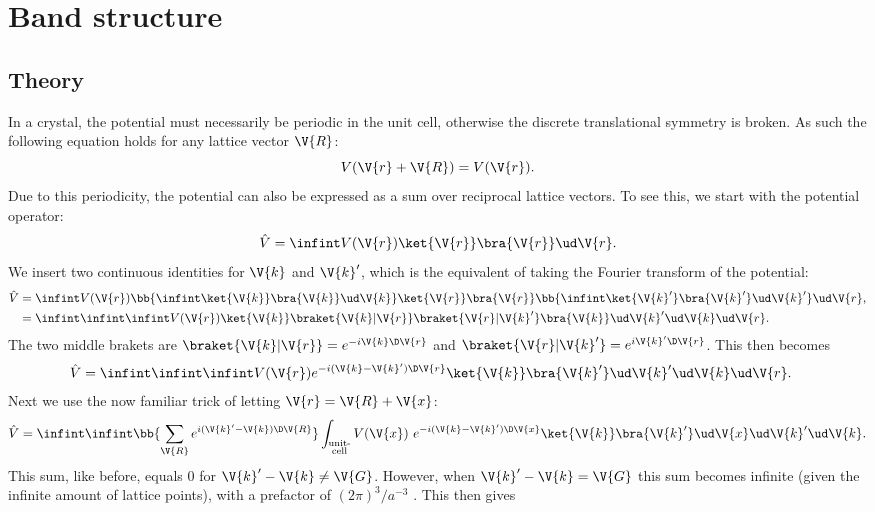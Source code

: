 \documentclass[main.tex]{subfiles}
\begin{document}
	
	\section{Band structure}\label{sec:band_structure}
	\subsection{Theory}
	In a crystal, the potential must necessarily be periodic in the unit cell, otherwise the discrete translational symmetry is broken. As such the following equation holds for any lattice vector $ \V{R} $:
	\begin{equation}\label{eq:band_period_V}
		V(\V{r}+\V{R}) = V(\V{r}).
	\end{equation}
	Due to this periodicity, the potential can also be expressed as a sum over reciprocal lattice vectors. To see this, we start with the potential operator:
	\begin{equation}
		\hat{V} = \infint V(\V{r}) \ket{\V{r}}\bra{\V{r}}\ud \V{r}.
	\end{equation}
	We insert two continuous identities for $ \V{k} $ and $ \V{k}' $, which is the equivalent of taking the Fourier transform of the potential: 
	\begin{align}
		\hat{V} &= \infint V(\V{r}) \bb{\infint \ket{\V{k}} \bra{\V{k}} \ud \V{k}  } \ket{\V{r}}\bra{\V{r}} \bb{\infint \ket{\V{k}'} \bra{\V{k}'} \ud \V{k}' } \ud \V{r} , \\
		&= \infint \infint \infint V(\V{r}) \ket{\V{k}} \braket{\V{k} | \V{r}} \braket{\V{r} | \V{k}'} \bra{\V{k}}  \ud\V{k}'   \ud\V{k}   \ud\V{r}.
	\end{align}
	The two middle brakets are $ \braket{\V{k}| \V{r}}= e^{-i \V{k} \D \V{r}} $ and $ \braket{\V{r} | \V{k}'} = e^{i \V{k}' \D \V{r}} $. This then becomes
	\begin{align}
		\hat{V} &= \infint \infint  \infint  V(\V{r}) e^{-i(\V{k}-\V{k}') \D \V{r}} \ket{\V{k}} \bra{\V{k}'} \ud\V{k}'   \ud\V{k}   \ud\V{r}.
	\end{align}
	Next we use the now familiar trick of letting $ \V{r} = \V{R} + \V{x} $:
	\begin{equation}
		\hat{V} = \infint \infint  \bb{\sum_{\V{R}} e^{i(\V{k}'-\V{k}) \D \V{R}}}  \int_{\substack{\text{unit-} \\\text{cell}}} V(\V{x})\  e^{-i (\V{k}-\V{k}') \D \V{x}} \ket{\V{k}} \bra{\V{k}'} \ud \V{x} \ud\V{k}'   \ud\V{k}.
	\end{equation}
	This sum, like before, equals 0 for $ \V{k}'-\V{k} \neq \V{G} $. However, when $ \V{k}'-\V{k} = \V{G} $ this sum becomes infinite (given the infinite amount of lattice points), with a prefactor of $ (2\pi)^3 / a^{-3} $ \cite{simon}. This then gives
\end{document}

